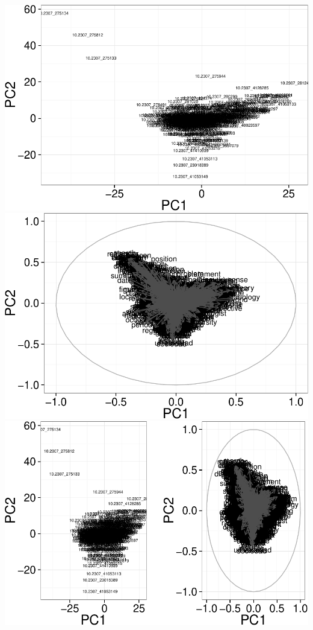 \documentclass[10pt]{article}
\newenvironment{CodeChunk}{}{}
\begin{document}
\begin{CodeChunk}
\begin{CodeChunk}
\includegraphics{509Assignment_files/figure-latex/onegram3-3} 
\includegraphics{509Assignment_files/figure-latex/onegram3-4} 
\includegraphics{509Assignment_files/figure-latex/onegram3-5} 

\end{CodeChunk}
\end{CodeChunk}
\end{document}
